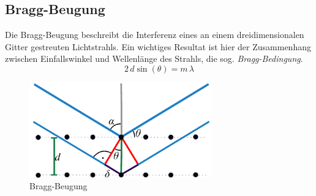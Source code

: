         \subsection*{Bragg-Beugung}
Die Bragg-Beugung beschreibt die Interferenz eines an einem dreidimensionalen 
Gitter gestreuten Lichtstrahls. Ein wichtiges Resultat ist hier der Zusammenhang 
zwischen Einfallswinkel und Wellenlänge des Strahls, die sog. \emph{Bragg-Bedingung}.
\[
    2\,d\sin(\theta) = m \, \lambda
\]
    \begin{figure}
        \centering
        \includegraphics[width=0.7\textwidth]{Abb/Bragg.pdf}
        \caption{Bragg-Beugung}
    \end{figure}

